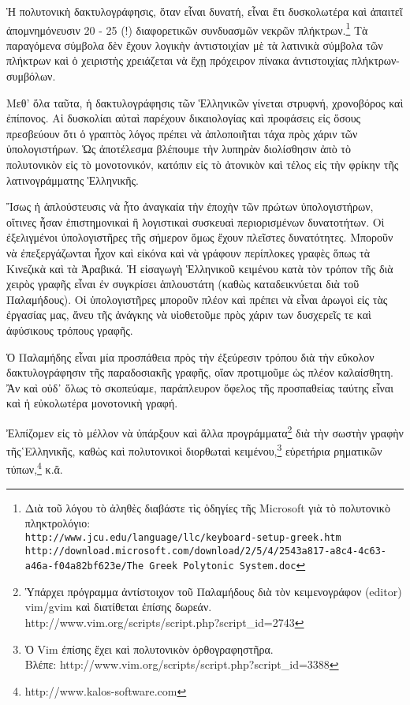 \documentclass[12pt,a4paper]{article}
\begin{document}
  Ἡ πολυτονικὴ δακτυλογράφησις, ὅταν εἶναι δυνατή, εἶναι ἔτι δυσκολωτέρα καὶ
  ἀπαιτεῖ ἀπομνημόνευσιν 20 - 25 (!) διαφορετικῶν συνδυασμῶν νεκρῶν
  πλήκτρων.\footnote{Διὰ τοῦ λόγου τὸ ἀληθὲς διαβάστε τὶς ὁδηγίες τῆς Microsoft 
  γιὰ τὸ πολυτονικὸ πληκτρολόγιο:\\
  \texttt{http://www.jcu.edu/language/llc/keyboard-setup-greek.htm}\\
  \texttt{\scriptsize{http://download.microsoft.com/download/2/5/4/2543a817-a8c4-4c63-a46a-f04a82bf623e/The Greek Polytonic System.doc}}} 
  Τὰ παραγόμενα σύμβολα δὲν ἔχουν λογικὴν ἀντιστοιχίαν μὲ τὰ λατινικὰ σύμβολα τῶν
  πλήκτρων καὶ ὁ χειριστὴς χρειάζεται νὰ ἔχῃ πρόχειρον πίνακα
  ἀντιστοιχίας πλήκτρων-συμβόλων.

  Μεθ’ ὅλα ταῦτα, ἡ δακτυλογράφησις τῶν Ἑλληνικῶν γίνεται στρυφνή,
  χρονοβόρος καὶ ἐπίπονος. Αἱ δυσκολίαι αὐταὶ παρέχουν δικαιολογίας καὶ
  προφάσεις εἰς ὅσους πρεσβεύουν ὅτι ὁ γραπτὸς λόγος πρέπει νὰ ἀπλοποιῆται
  τάχα πρὸς χάριν τῶν ὑπολογιστήρων.  Ὡς ἀποτέλεσμα βλέπουμε τὴν λυπηρὰν
  διολίσθησιν ἀπὸ τὸ πολυτονικὸν εἰς τὸ μονοτονικόν, κατόπιν εἰς τὸ
  ἀτονικὸν καὶ τέλος εἰς τὴν φρίκην τῆς λατινογράμματης Ἑλληνικῆς.

  Ἴσως ἡ ἁπλούστευσις νὰ ἦτο ἀναγκαία τὴν ἐποχὴν τῶν πρώτων ὑπολογιστήρων,
  οἵτινες ἦσαν ἐπιστημονικαὶ ἢ λογιστικαὶ συσκευαὶ περιορισμένων
  δυνατοτήτων.  Οἱ ἐξελιγμένοι ὑπολογιστῆρες τῆς σήμερον ὅμως ἔχουν
  πλεῖστες δυνατότητες.  Μποροῦν νὰ ἐπεξεργάζωνται ἦχον καὶ εἰκόνα καὶ νὰ
  γράφουν περίπλοκες γραφὲς ὅπως τὰ Κινεζικὰ καὶ τὰ Ἀραβικά. Ἡ εἰσαγωγὴ
  Ἑλληνικοῦ κειμένου κατὰ τὸν τρόπον τῆς διὰ χειρὸς γραφῆς εἶναι ἐν
  συγκρίσει ἁπλουστάτη (καθὼς καταδεικνύεται διὰ τοῦ Παλαμήδους).  Οἱ
  ὑπολογιστῆρες μποροῦν πλέον καὶ πρέπει νὰ εἶναι ἀρωγοὶ εἰς τὰς ἐργασίας
  μας, ἄνευ τῆς ἀνάγκης νὰ υἱοθετοῦμε πρὸς χάριν των δυσχερεῖς τε καὶ
  ἀφύσικους τρόπους γραφῆς.

  Ὁ Παλαμήδης εἶναι μία προσπάθεια πρὸς τὴν ἐξεύρεσιν τρόπου διὰ τὴν εὔκολον 
  δακτυλογράφησιν τῆς παραδοσιακῆς γραφῆς, οἵαν προτιμοῦμε ὡς πλέον
  καλαίσθητη. Ἂν καὶ οὐδ᾽ ὅλως τὸ σκοπεύαμε, παράπλευρον ὄφελος τῆς προσπαθείας 
  ταύτης εἶναι καὶ ἡ εὐκολωτέρα μονοτονικὴ γραφή.

  Ἐλπίζομεν εἰς τὸ μέλλον νὰ ὑπάρξουν καὶ ἄλλα προγράμματα\footnote{Ὑπάρχει
  πρόγραμμα ἀντίστοιχον τοῦ Παλαμήδους διὰ τὸν κειμενογράφον (editor) vim/gvim
  καὶ διατίθεται ἐπίσης δωρεάν.
  http://www.vim.org/scripts/script.php?script\_id=2743} διὰ τὴν σωστὴν
  γραφὴν τῆς῾Ελληνικῆς, καθὼς καὶ πολυτονικοὶ διορθωταὶ
  κειμένου,\footnote{Ὁ Vim ἐπίσης ἔχει καὶ πολυτονικὸν ὁρθογραφηστῆρα.\\
  Βλέπε: http://www.vim.org/scripts/script.php?script\_id=3388} εὑρετήρια
  ρηματικῶν τύπων,\footnote{http://www.kalos-software.com} κ.ἄ.
\end{document}
